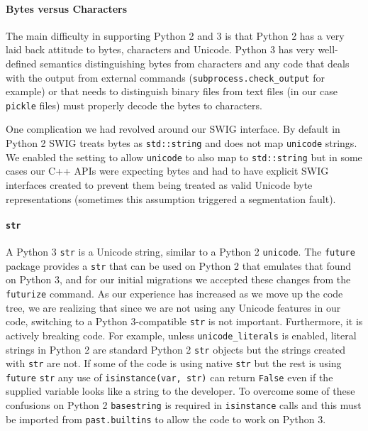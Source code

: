 \documentclass[11pt,twoside]{article}
\begin{document}
\paragraph{Bytes versus Characters}

The main difficulty in supporting Python 2 and 3 is that Python 2 has a very laid back attitude to bytes, characters and Unicode.
Python 3 has very well-defined semantics distinguishing bytes from characters and any code that deals with the output from external commands (\texttt{subprocess.check\_output} for example) or that needs to distinguish binary files from text files (in our case \texttt{pickle} files) must properly decode the bytes to characters.

One complication we had revolved around our SWIG \citep{beazley2003automated} interface.
By default in Python 2 SWIG treats bytes as \texttt{std::string} and does not map \texttt{unicode} strings.
We enabled the setting to allow \texttt{unicode} to also map to \texttt{std::string} but in some cases our C++ APIs were expecting bytes and had to have explicit SWIG interfaces created to prevent them being treated as valid Unicode byte representations (sometimes this assumption triggered a segmentation fault).

\paragraph{\texttt{str}}

A Python 3 \texttt{str} is a Unicode string, similar to a Python 2 \texttt{unicode}.
The \texttt{future} package provides a \texttt{str} that can be used on Python 2 that emulates that found on Python 3, and for our initial migrations we accepted these changes from the \texttt{futurize} command.
As our experience has increased as we move up the code tree, we are realizing that since we are not using any Unicode features in our code, switching to a Python 3-compatible \texttt{str} is not important.
Furthermore, it is actively breaking code.
For example, unless \texttt{unicode\_literals} is enabled, literal strings in Python 2 are standard Python 2 \texttt{str} objects but the strings created with \texttt{str} are not.
If some of the code is using native \texttt{str} but the rest is using \texttt{future} \texttt{str} any use of \texttt{isinstance(var, str)} can return \texttt{False} even if the supplied variable looks like a string to the developer.
To overcome some of these confusions on Python 2 \texttt{basestring} is required in \texttt{isinstance} calls and this must be imported from \texttt{past.builtins} to allow the code to work on Python 3.
\end{document}
